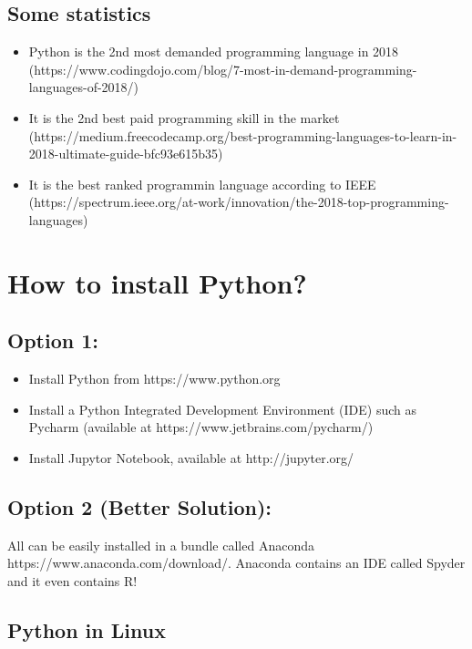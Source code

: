 \documentclass[11pt]{article}
\providecommand{\tightlist}{%
      \setlength{\itemsep}{0pt}\setlength{\parskip}{0pt}}
\begin{document}
    \subsection{Some statistics}\label{some-statistics}

\begin{itemize}
\item
  Python is the 2nd most demanded programming language in 2018
  (https://www.codingdojo.com/blog/7-most-in-demand-programming-languages-of-2018/)
\item
  It is the 2nd best paid programming skill in the market
  (https://medium.freecodecamp.org/best-programming-languages-to-learn-in-2018-ultimate-guide-bfc93e615b35)
\item
  It is the best ranked programmin language according to IEEE
  (https://spectrum.ieee.org/at-work/innovation/the-2018-top-programming-languages)
\end{itemize}

    \section{How to install Python?}\label{how-to-install-python}

    \subsection{Option 1:}\label{option-1}

\begin{itemize}
\tightlist
\item
  Install Python from https://www.python.org
\item
  Install a Python Integrated Development Environment (IDE) such as
  Pycharm (available at https://www.jetbrains.com/pycharm/)
\item
  Install Jupytor Notebook, available at http://jupyter.org/
\end{itemize}

    \subsection{\texorpdfstring{Option 2 (\textbf{Better
Solution}):}{Option 2 (Better Solution):}}\label{option-2-better-solution}

All can be easily installed in a bundle called Anaconda
https://www.anaconda.com/download/. Anaconda contains an IDE called
Spyder and it even contains R!

    \subsection{Python in Linux}\label{python-in-linux}
\end{document}
